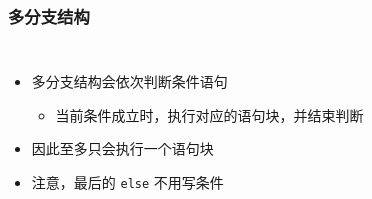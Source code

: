 \begin{frame}[fragile]
    \frametitle{多分支结构}

    \begin{columns}
        \begin{itemize}[<+->]
            \item 多分支结构会依次判断条件语句

                \begin{itemize}
                    \item 当前条件成立时，执行对应的语句块，并结束判断
                \end{itemize}

            \item 因此至多只会执行一个语句块

            \item 注意，最后的 \lstinline|else| 不用写条件
        \end{itemize}

        
    \end{columns}
\end{frame}

